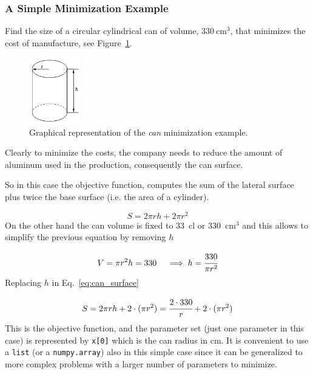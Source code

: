 \subsubsection{A Simple Minimization Example}
\label{example}

Find the size of a circular cylindrical can of volume, \(330~\mathrm{cm}^3\), that minimizes the cost of manufacture, see Figure~\ref{fig:cylinder}.

\begin{figure}[h]
\centering
\includegraphics[width=0.2\textwidth]{figures/cylinder.png}
\caption{Graphical representation of the \emph{can} minimization example.}
\label{fig:cylinder}
\end{figure}

Clearly to minimize the costs, the company needs to reduce the amount of aluminum used in the production, consequently the can surface. 

So in this case the objective function, computes the sum of the lateral surface plus twice the base surface (i.e. the area of a cylinder).

\begin{equation} 
S = 2\pi rh + 2\pi r^2 
\label{eq:can_surface}
\end{equation}
On the other hand the can volume is fixed to 33~cl or 330~\(\mathrm{cm}^3\) and this allows to simplify the previous equation by removing \(h\)

\begin{equation*} 
V = \pi r^2 h = 330\quad\implies h = \cfrac{330}{\pi r^2}
\end{equation*}
Replacing $h$ in Eq.~\ref{eq:can_surface} 

\begin{equation}
S = 2\pi rh + 2\cdot(\pi r^2) = \cfrac{2\cdot 330}{r} + 2\cdot(\pi r^2)
\end{equation}
This is the objective function, and the parameter set (just one parameter in this case) is represented by \texttt{x[0]} which is the can radius in cm. It is convenient to use a \texttt{list} (or a \texttt{numpy.array}) also in this simple case since it can be generalized to more complex problems with a larger number of parameters to minimize. 

